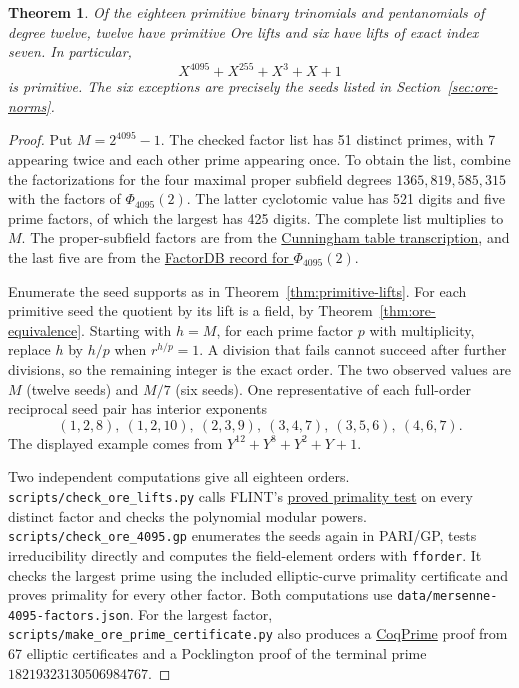 \documentclass[11pt]{article}
\newtheorem{theorem}{Theorem}
\begin{document}
\begin{theorem}\label{thm:ore4095}
Of the eighteen primitive binary trinomials and pentanomials of degree
twelve, twelve have primitive Ore lifts and six have lifts of exact
index seven. In particular,
\[
             X^{4095}+X^{255}+X^3+X+1
\]
is primitive. The six exceptions are precisely the seeds listed in
Section~\ref{sec:ore-norms}.
\end{theorem}
\begin{proof}
Put \(M=2^{4095}-1\). The checked factor list has 51 distinct primes,
with 7 appearing twice and each other prime appearing once.
To obtain the list, combine the factorizations for the four maximal
proper subfield degrees \(1365,819,585,315\) with the factors of
\(\Phi_{4095}(2)\). The latter cyclotomic value has 521 digits and
five prime factors, of which the largest has 425 digits. The complete
list multiplies to \(M\). The proper-subfield factors are from the
\href{https://github.com/postvakje/Reformatted-Cunningham-Project-tables/blob/dff2e282ff15399b16b4fb840a410aa2a37076b7/pmain422_table2-.json}
{Cunningham table transcription}, and the last five are from the
\href{https://factordb.com/index.php?id=1100000000853413115}
{FactorDB record for \(\Phi_{4095}(2)\)}.

Enumerate the seed supports as in Theorem~\ref{thm:primitive-lifts}.
For each primitive seed the quotient by its lift is a field, by
Theorem~\ref{thm:ore-equivalence}. Starting with \(h=M\), for each
prime factor \(p\) with multiplicity, replace \(h\) by \(h/p\) when
\(r^{h/p}=1\). A division that fails cannot succeed after further divisions, so the
remaining integer is the exact order. The two observed
values are \(M\) (twelve seeds) and \(M/7\) (six seeds).
One representative of each full-order reciprocal seed pair has
interior exponents
\[
 (1,2,8),\ (1,2,10),\ (2,3,9),\ (3,4,7),\ (3,5,6),\ (4,6,7).
\]
The displayed example comes from \(Y^{12}+Y^8+Y^2+Y+1\).

Two independent computations give all eighteen orders.
\nolinkurl{scripts/check_ore_lifts.py} calls FLINT's
\href{https://flintlib.org/doc/fmpz/fmpz_is_prime.html}
{proved primality test} on every distinct factor and checks the
polynomial modular powers. \nolinkurl{scripts/check_ore_4095.gp}
enumerates the seeds again in PARI/GP, tests irreducibility directly
and computes the field-element orders with \texttt{fforder}.
It checks the largest prime using the included elliptic-curve
primality certificate and proves primality for every other factor.
Both computations use \nolinkurl{data/mersenne-4095-factors.json}.
For the largest factor, \nolinkurl{scripts/make_ore_prime_certificate.py}
also produces a \href{https://github.com/thery/coqprime}{CoqPrime}
proof from 67 elliptic certificates and a Pocklington proof of the
terminal prime \(18219323130506984767\).
\end{proof}
\end{document}
